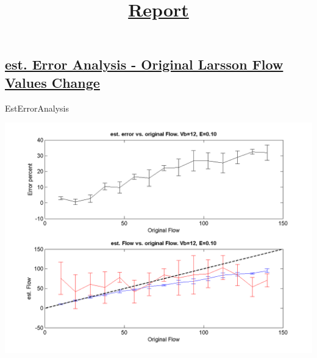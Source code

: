 \documentclass[english]{article}
\begin{document}
\graphicspath{ {H:\Guy\Dropbox\University\Msc\Thesis\General\Matlab Simulations\Flow Extraction\Latest Code\For Article\Run_Output\ } }
\title{\underline{Report}}
\maketitle


\subsection*{\underline{est. Error Analysis - Original Larsson Flow Values Change}}

EstErrorAnalysis




\includegraphics[scale=0.7]{Est_Error_Analysis_Larsson_F.png}
\end{document}
